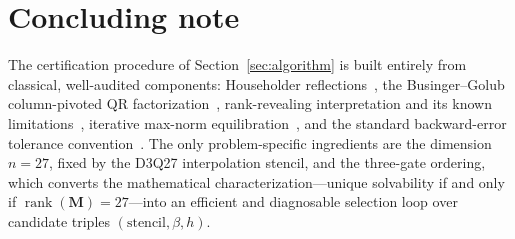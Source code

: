 \documentclass[11pt,a4paper]{article}
\theoremstyle{definition}
\begin{document}
\section*{Concluding note}

The certification procedure of Section~\ref{sec:algorithm} is built
entirely from classical, well-audited components: Householder
reflections~\cite{householder1958,golubvanloan2013,trefethenbau1997},
the Businger--Golub column-pivoted QR
factorization~\cite{busingergolub1965,quintanaorti1998,lapack1999},
rank-revealing interpretation and its known
limitations~\cite{chan1987,kahan1966,gueisenstat1996}, iterative
max-norm equilibration~\cite{vandersluis1969,ruiz2001}, and the
standard backward-error tolerance convention~\cite{higham2002,
golubvanloan2013}. The only problem-specific ingredients are the
dimension $n=27$, fixed by the D3Q27 interpolation stencil, and the
three-gate ordering, which converts the mathematical
characterization---unique solvability if and only if
$\operatorname{rank}(\bm M)=27$---into an efficient and diagnosable
selection loop over candidate triples $(\text{stencil},\beta,h)$.
\end{document}
